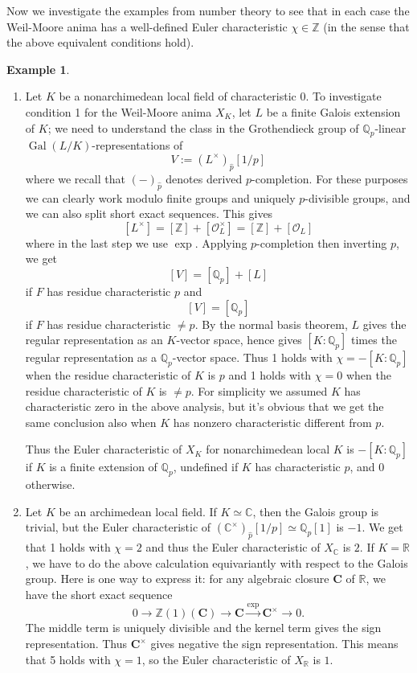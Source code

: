 \documentclass[12pt]{article}
\theoremstyle{definition}
\newtheorem{example}[theorem]{Example}
\newcommand{\on}{\operatorname}
\newcommand{\mc}{\mathcal}
\newcommand{\mbb}{\mathbb}
\newcommand{\wh}{\widehat}
\begin{document}
Now we investigate the examples from number theory to see that in each case the Weil-Moore anima has a well-defined Euler characteristic $\chi\in\mbb{Z}$ (in the sense that the above equivalent conditions hold).

\begin{example}
\begin{enumerate}
\item Let $K$ be a nonarchimedean local field of characteristic $0$. To investigate condition 1 for the Weil-Moore anima $X_K$, let $L$ be a finite Galois extension of $K$; we need to understand the class in the Grothendieck group of $\mbb{Q}_p$-linear $\on{Gal}(L/K)$-representations of
$$V:= (L^\times)_{\wh{p}}[1/p]$$
where we recall that $(-)_{\wh{p}}$ denotes derived $p$-completion.  For these purposes we can clearly work modulo finite groups and uniquely $p$-divisible groups, and we can also split short exact sequences.  This gives
$$[L^\times] = [\mbb{Z}] + [\mathcal{O}^\times_L] = [\mbb{Z}] + [\mc{O}_L]$$
where in the last step we use $\on{exp}$.  Applying $p$-completion then inverting $p$, we get
$$[V] = [\mbb{Q}_p] + [L]$$
if $F$ has residue characteristic $p$ and
$$[V] = [\mbb{Q}_p]$$
if $F$ has residue characteristic $\neq p$.  By the normal basis theorem, $L$ gives the regular representation as an $K$-vector space, hence gives $[K:\mbb{Q}_p]$ times the regular representation as a $\mbb{Q}_p$-vector space.  Thus 1 holds with $\chi=-[K:\mbb{Q}_p]$ when the residue characteristic of $K$ is $p$ and 1 holds with $\chi=0$ when the residue characteristic of $K$ is $\neq p$.  For simplicity we assumed $K$ has characteristic zero in the above analysis, but it's obvious that we get the same conclusion also when $K$ has nonzero characteristic different from $p$.

Thus the Euler characteristic of $X_K$ for nonarchimedean local $K$ is $-[K:\mbb{Q}_p]$ if $K$ is a finite extension of $\mbb{Q}_p$, undefined if $K$ has characteristic $p$, and $0$ otherwise.

\item Let $K$ be an archimedean local field.  If $K\simeq\mbb{C}$, then the Galois group is trivial, but the Euler characteristic of $(\mbb{C}^\times)_{\wh{p}}[1/p]\simeq\mbb{Q}_p[1]$ is $-1$.  We get that 1 holds with $\chi=2$ and thus the Euler characteristic of $X_\mbb{C}$ is $2$.  If $K=\mbb{R}$, we have to do the above calculation equivariantly with respect to the Galois group.  Here is one way to express it: for any algebraic closure $\mathbf{C}$ of $\mathbb{R}$, we have the short exact sequence
$$0 \to \mbb{Z}(1)(\mathbf{C}) \to \mathbf{C}\overset{\on{exp}}{\rightarrow} \mathbf{C}^\times \to 0.$$
The middle term is uniquely divisible and the kernel term gives the sign representation.  Thus $\mathbf{C}^\times$ gives negative the sign representation.  This means that 5 holds with $\chi=1$, so the Euler characteristic of $X_{\mbb{R}}$ is $1$.


\end{enumerate}
\end{example}
\end{document}
